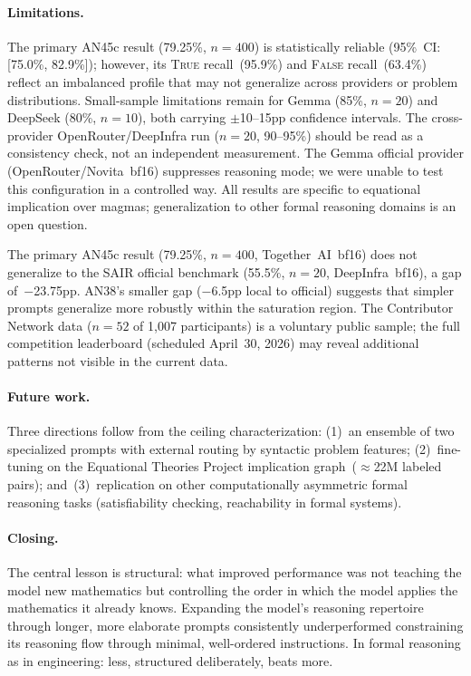 \documentclass[11pt]{article}
\begin{document}
\paragraph{Limitations.}
The primary AN45c result (79.25\%, $n=400$) is statistically reliable
(95\%~CI: [75.0\%, 82.9\%]); however, its \textsc{True} recall~(95.9\%)
and \textsc{False} recall~(63.4\%) reflect an imbalanced profile that
may not generalize across providers or problem distributions. Small-sample
limitations remain for Gemma (85\%, $n=20$) and DeepSeek (80\%, $n=10$),
both carrying $\pm$10--15pp confidence intervals. The cross-provider
OpenRouter/DeepInfra run ($n=20$, 90--95\%) should be read as a
consistency check, not an independent measurement. The Gemma official
provider (OpenRouter/Novita~bf16) suppresses reasoning mode; we were
unable to test this configuration in a controlled way. All results are
specific to equational implication over magmas; generalization to other
formal reasoning domains is an open question.

The primary AN45c result (79.25\%, $n=400$, Together~AI~bf16) does not
generalize to the SAIR official benchmark (55.5\%, $n=20$,
DeepInfra~bf16), a gap of~$-$23.75pp. AN38's smaller gap ($-$6.5pp
local to official) suggests that simpler prompts generalize more
robustly within the saturation region. The Contributor Network data
($n=52$ of 1{,}007 participants) is a voluntary public sample; the full
competition leaderboard (scheduled April~30, 2026) may reveal additional
patterns not visible in the current data.

\paragraph{Future work.}
Three directions follow from the ceiling characterization: (1)~an
ensemble of two specialized prompts with external routing by syntactic
problem features; (2)~fine-tuning on the Equational Theories Project
implication graph~($\approx$22M labeled pairs); and~(3)~replication
on other computationally asymmetric formal reasoning tasks
(satisfiability checking, reachability in formal systems).

\paragraph{Closing.}
The central lesson is structural: what improved performance was not
teaching the model new mathematics but controlling the order in which
the model applies the mathematics it already knows. Expanding the
model's reasoning repertoire through longer, more elaborate prompts
consistently underperformed constraining its reasoning flow through
minimal, well-ordered instructions. In formal reasoning as in
engineering: less, structured deliberately, beats more.



\end{document}
